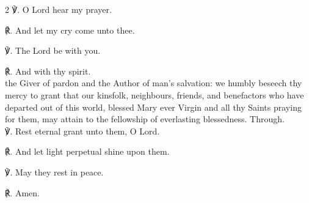 \begin{multicols}{2}
℣. O Lord hear my prayer.\par
℟. And let my cry come unto thee.\par
℣. The Lord be with you.\par
℟. And with thy spirit.\\

{} the Giver of pardon and the Author of man's salvation: we humbly beseech thy mercy to grant that our kinsfolk, neighbours, friends, and benefactors who have departed out of this world, blessed Mary ever Virgin and all thy Saints praying for them, may attain to the fellowship of everlasting blessedness. Through.\\

℣. Rest eternal grant unto them, O Lord.\par
℟. And let light perpetual shine upon them.\par
℣. May they rest in peace.\par
℟. Amen.
\end{multicols}
